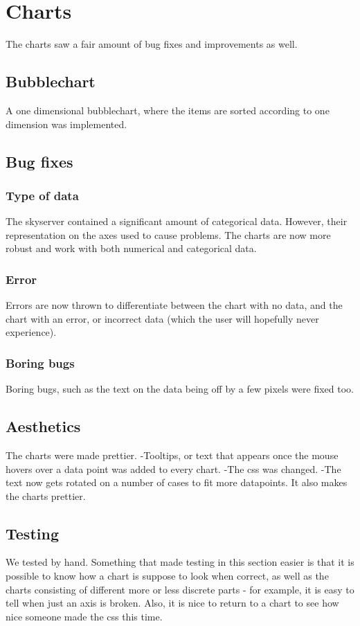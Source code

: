 \section{Charts}
The charts saw a fair amount of bug fixes and improvements as well.

\subsection{Bubblechart}
A one dimensional bubblechart, where the items are sorted according to one dimension was implemented.

\subsection{Bug fixes}
  \subsubsection{Type of data}
  The skyserver contained a significant amount of categorical data. However, their representation on the axes
  used to cause problems. The charts are now more robust and work with both numerical and categorical data.
  \subsubsection{Error}
  Errors are now thrown to differentiate between the chart with no data, and the chart with an error,
  or incorrect data (which the user will hopefully never experience).
  \subsubsection{Boring bugs}
  Boring bugs, such as the text on the data being off by a few pixels were fixed too.

\subsection{Aesthetics}
  The charts were made prettier.
  -Tooltips, or text that appears once the mouse hovers over a data point was added to every chart.
  -The css was changed.
  -The text now gets rotated on a number of cases to fit more datapoints. It also makes the charts prettier.
  
\subsection{Testing}
  We tested by hand. Something that made testing in this section easier is that it is possible to know
  how a chart is suppose to look when correct, as well as the charts consisting of different more or less discrete
  parts - for example, it is easy to tell when just an axis is broken.
  Also, it is nice to return to a chart to see how nice someone made the css this time. 
